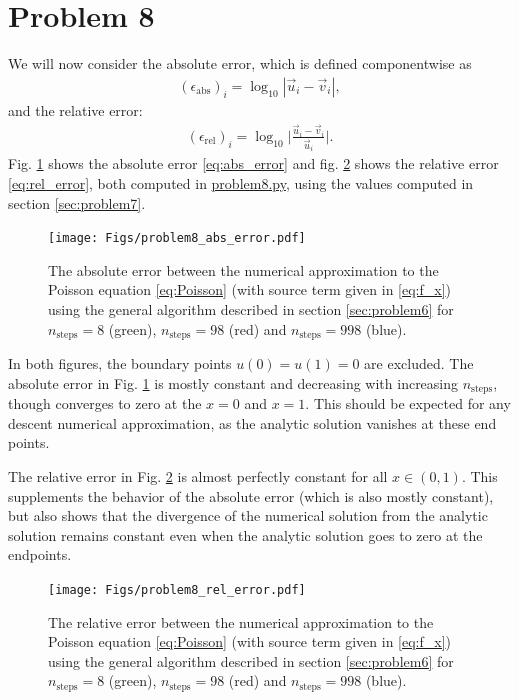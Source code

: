 \documentclass[english,notitlepage,reprint,nofootinbib]{revtex4-2}  %
\begin{document}
\section{Problem 8}
We will now consider the absolute error, which is defined componentwise as
\begin{align}
    (\epsilon_{\text{abs}})_i = \log_{10}|\vec{u}_i-\vec{v}_i|, \label{eq:abs_error}
\end{align}
and the relative error:
\begin{align}
    (\epsilon_{\text{rel}})_i = \log_{10}\big\vert\frac{\vec{u}_i-\vec{v}_i}{\vec{u}_i}\big\vert.   \label{eq:rel_error}
\end{align}
Fig. \ref{fig:abs_error} shows the absolute error \eqref{eq:abs_error} and fig. \ref{fig:rel_error} shows the relative error \eqref{eq:rel_error}, both computed in \href{https://github.com/isakrukan/FYS4150/blob/main/Project1/Code/problem8.py}{problem8.py}, using the values computed in section \ref{sec:problem7}.
\begin{figure}[h!]
    \texttt{[image: Figs/problem8\_abs\_error.pdf]}
    \caption{The absolute error between the numerical approximation to the Poisson equation \eqref{eq:Poisson} (with source term given in \eqref{eq:f_x}) using the general algorithm described in section \ref{sec:problem6} for \(n_{\text{steps}}=8\) (green), \(n_{\text{steps}}=98\) (red) and \(n_{\text{steps}}=998\) (blue). }
    \label{fig:abs_error}
\end{figure}



In both figures, the boundary points \(u(0)=u(1)=0\) are excluded. The absolute error in Fig. \ref{fig:abs_error} is mostly constant and decreasing with increasing \(n_{\text{steps}}\), though converges to zero at the \(x=0\) and \(x=1\). This should be expected for any descent numerical approximation, as the analytic solution vanishes at these end points.

The relative error in Fig. \ref{fig:rel_error} is almost perfectly constant for all \(x\in(0,1)\). This supplements the behavior of the absolute error (which is also mostly constant), but also shows that the divergence of the numerical solution from the analytic solution remains constant even when the analytic solution goes to zero at the endpoints.
\begin{figure}[h!]
    \texttt{[image: Figs/problem8\_rel\_error.pdf]}
    \caption{The relative error between the numerical approximation to the Poisson equation \eqref{eq:Poisson} (with source term given in \eqref{eq:f_x}) using the general algorithm described in section \ref{sec:problem6} for \(n_{\text{steps}}=8\) (green), \(n_{\text{steps}}=98\) (red) and \(n_{\text{steps}}=998\) (blue). }
    \label{fig:rel_error}
\end{figure}
\end{document}
